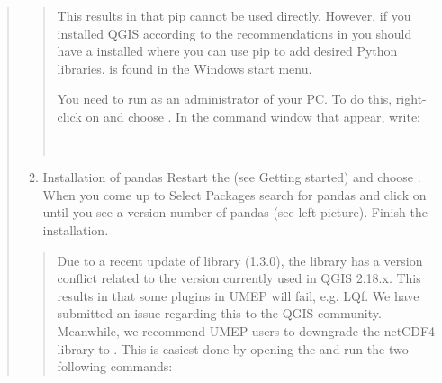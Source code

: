 \documentclass[letterpaper,10pt,english]{sphinxmanual}
\begin{document}
\begin{itemize}
\begin{enumerate}
\begin{description}
\begin{quote}
\begin{enumerate}
\end{enumerate}
\begin{quote}

This results in that pip cannot be used directly. However, if you installed QGIS according to the recommendations in {\hyperref[\detokenize{Getting_Started::doc}]{}} you should have a  installed where you can use pip to add desired Python libraries.  is found in the Windows start menu.

You need to run as an administrator of your PC. To do this, right-click on  and choose . In the command window that appear, write:

%
\begin{sphinxVerbatim}[commandchars=\\\{\}]
  
\end{sphinxVerbatim}
\end{quote}
\begin{enumerate}
\setcounter{enumii}{1}
\item {} 
Installation of pandas Restart the  (see Getting started) and choose . When you come up to Select Packages search for pandas and click on  until you see a version number of pandas (see left picture). Finish the installation.

\end{enumerate}
\begin{quote}



Due to a recent update of  library (1.3.0), the  library has a version conflict related to the  version currently used in QGIS 2.18.x. This results in that some plugins in UMEP will fail, e.g. LQf.
We have submitted an issue regarding this to the QGIS community. Meanwhile, we recommend UMEP users to downgrade the netCDF4 library to . This is easiest done by opening the  and run the two following commands:


\end{quote}
\end{quote}
\end{description}
\end{enumerate}
\end{itemize}
\end{document}
